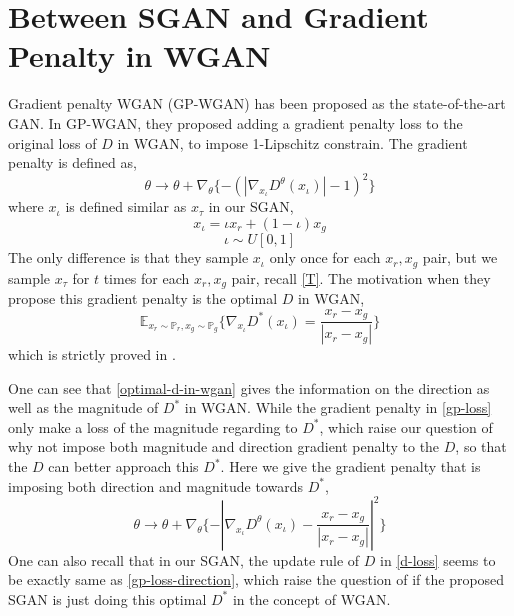 \documentclass[letterpaper]{article} %
\begin{document}
\section{Between SGAN and Gradient Penalty in WGAN}

Gradient penalty WGAN (GP-WGAN) \cite{gulrajani2017improved} has been proposed as the state-of-the-art GAN. In GP-WGAN, they proposed adding a gradient penalty loss to the original loss of $D$ in WGAN, to impose 1-Lipschitz constrain. The gradient penalty is defined as,
\begin{equation}\label{gp-loss}
    \theta \longrightarrow \theta + \nabla_{\theta} \{ - (|\nabla_{x_{\iota}}D^{\theta}(x_{\iota})|-1)^2 \}
\end{equation}
where $x_\iota$ is defined similar as $x_\tau$ in our SGAN,
\begin{equation}\label{x-iota}
  x_{\iota} = \iota x_{r} + (1-\iota) x_g
\end{equation}
\begin{equation}\label{iota}
  \iota \sim U[0,1]
\end{equation}
The only difference is that they sample $x_\iota$ only once for each $x_r,x_g$ pair, but we sample $x_\tau$ for $t$ times for each $x_r,x_g$ pair, recall \eqref{T}.
The motivation when they propose this gradient penalty is the optimal $D$ in WGAN,
\begin{equation}\label{optimal-d-in-wgan}
  \mathbb{E}_{x_r\sim\mathbb{P}_r,x_g\sim\mathbb{P}_g} \{\nabla_{x_{\iota}}D^{\ast}(x_\iota)=\frac{x_r-x_g}{|x_r-x_g|}\}
\end{equation}
which is strictly proved in \cite{gulrajani2017improved}.

One can see that \eqref{optimal-d-in-wgan} gives the information on the direction as well as the magnitude of $D^{\ast}$ in WGAN.
While the gradient penalty in \eqref{gp-loss} only make a loss of the magnitude regarding to $D^{\ast}$, which raise our question of why not impose both magnitude and direction gradient penalty to the $D$, so that the $D$ can better approach this $D^{\ast}$.
Here we give the gradient penalty that is imposing both direction and magnitude towards $D^{\ast}$,
\begin{equation}\label{gp-loss-direction}
  \theta \longrightarrow \theta + \nabla_{\theta} \{ - |\nabla_{x_{\iota}}D^{\theta}(x_{\iota})-\frac{x_{r}-x_{g}}{|x_{r}-x_{g}|}|^2 \}
\end{equation}
One can also recall that in our SGAN, the update rule of $D$ in \eqref{d-loss} seems to be exactly same as \eqref{gp-loss-direction}, which raise the question of if the proposed SGAN is just doing this optimal $D^{\ast}$ in the concept of WGAN.
\end{document}
